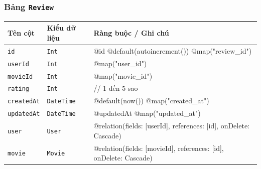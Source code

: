 \subsubsection{Bảng \texttt{Review}}
\begin{longtable}{|p{3.6cm}|p{3.0cm}|p{8.9cm}|}
\hline
\rowcolor{headerblue} \textbf{Tên cột} & \textbf{Kiểu dữ liệu} & \textbf{Ràng buộc / Ghi chú} \\ \hline
\endhead
\texttt{id} & \texttt{Int} & \small @id @default(autoincrement()) @map("review\_id") \\ \hline
\texttt{userId} & \texttt{Int} & \small @map("user\_id") \\ \hline
\texttt{movieId} & \texttt{Int} & \small @map("movie\_id") \\ \hline
\texttt{rating} & \texttt{Int} & \small // 1 đến 5 sao \\ \hline
\texttt{createdAt} & \texttt{DateTime} & \small @default(now()) @map("created\_at") \\ \hline
\texttt{updatedAt} & \texttt{DateTime} & \small @updatedAt @map("updated\_at") \\ \hline
\texttt{user} & \texttt{User} & \small @relation(fields: [userId], references: [id], onDelete: Cascade) \\ \hline
\texttt{movie} & \texttt{Movie} & \small @relation(fields: [movieId], references: [id], onDelete: Cascade) \\ \hline
\end{longtable}

